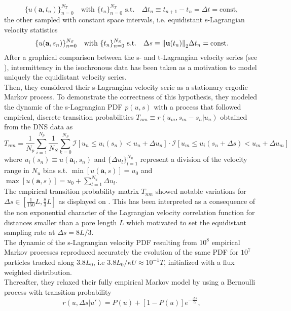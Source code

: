 \[
\{u(\textbf{a},t_{n})\}_{n=0}^{N_T}\quad\textrm{with $\{t_n\}_{n=0}^{N_T}$ s.t.}\quad \Delta t_n\equiv t_{n+1}-t_n = \Delta t=\mathrm{const},
\] 
the other sampled with constant space intervals, i.e. equidistant s-Lagrangian velocity statistics
\[\{u(\textbf{a},s_{n})\}_{n=0}^{N_S}\quad\textrm{with $\{t_n\}_{n=0}^{N_S}$ s.t.}\quad \Delta s \equiv\norm{\textbf{u}(t_n)}_2\Delta t_n = \mathrm{const}.
\]
After a graphical comparison between the s- and t-Lagrangian velocity series (see \citet[Fig. 2]{Puyguiraud2019}), intermittency in the isochronous data has been taken as a motivation to model uniquely the equidistant velocity series.\\
Then, they considered their s-Lagrangian velocity serie as a stationary ergodic Markov process. 
To demonstrate the correctness of this hypothesis, they modeled the dynamic of the s-Lagrangian PDF $p(u,s)$ with a process that followed empirical, discrete transition probabilities $T_{nm}\equiv r(u_m,s_m-s_n|u_n)$ obtained from the DNS data as
\[
T_{nm}=\frac{1}{N_p}\sum_{i=1}^{N_p}\frac{1}{N_S}\sum_{k=0}^{N_S}\mathcal{I}[u_n \leq u_i(s_n) < u_n + \Delta u_n]\cdot\mathcal{I}[u_m \leq u_i(s_n+\Delta s) < u_m + \Delta u_m]
\]
where $u_i(s_n)\equiv u(\textbf{a}_i,s_n)$ and $\{\Delta u_l\}_{l=1}^{N_u}$ represent a division of the velocity range in $N_u$ bins s.t. $\min[u(\textbf{a},s)]=u_0$ and $\max[u(\textbf{a},s)]=u_{0}+\sum_{l=1}^{N_u}\Delta u_l$.\\
The empirical transition probability matrix $T_{nm}$ showed notable variations for $\Delta s\in[\frac{1}{150}L,\frac{8}{3}L]$ as displayed on \citet[Fig. 7]{Puyguiraud2019}. 
This has been interpreted as a consequence of the non exponential character of the Lagrangian velocity correlation function for distances smaller than a pore length $L$ which motivated \citeauthor{Puyguiraud2019} to set the equidistant sampling rate at $\Delta s = 8L/3$.\\
The dynamic of the s-Lagrangian velocity PDF resulting from $10^8$ empirical Markov processes reproduced accurately the evolution of the same PDF for $10^7$ particles tracked along $3.8L_0$, i.e $3.8L_0/\kappa U\approx 10^{-1}T$, initialized with a flux weighted distribution.\\
Thereafter, they relaxed their fully empirical Markov model by using a Bernoulli process with transition probability
\begin{equation}\label{eq:bernoulli}
r(u,\Delta s|u')=P(u) + [1 - P(u)] e^{-\frac{\Delta s}{l_c}},
\end{equation}
